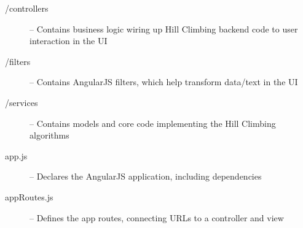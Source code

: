 \begin{description}
  \item[/controllers]   -- Contains business logic wiring up Hill Climbing backend code to user interaction in the UI
  \item[/filters]       -- Contains AngularJS filters, which help transform data/text in the UI
  \item[/services]      -- Contains models and core code implementing the Hill Climbing algorithms
  \item[app.js]         -- Declares the AngularJS application, including dependencies
  \item[appRoutes.js]   -- Defines the app routes, connecting URLs to a controller and view
\end{description}
